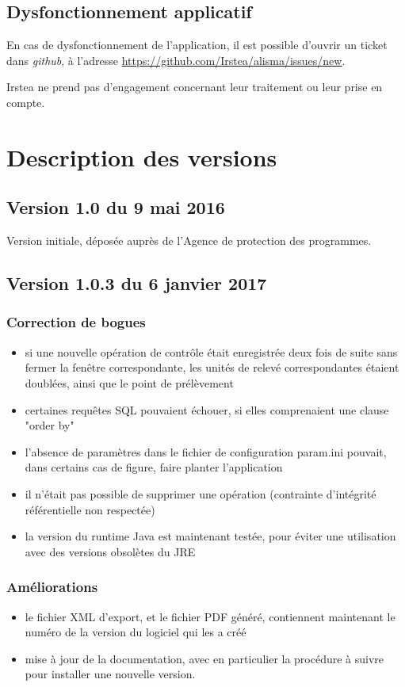 \subsection{Dysfonctionnement applicatif}

En cas de dysfonctionnement de l'application, il est possible d'ouvrir un ticket dans \textit{github}, à l'adresse \url{https://github.com/Irstea/alisma/issues/new}.

Irstea ne prend pas d'engagement concernant leur traitement ou leur prise en compte.

\section{Description des versions}
\subsection{Version 1.0 du 9 mai 2016}
Version initiale, déposée auprès de l'Agence de protection des programmes.

\subsection{Version 1.0.3 du 6 janvier 2017}
\subsubsection{Correction de bogues}
\begin{itemize}
\item si une nouvelle opération de contrôle était enregistrée deux fois de suite sans fermer la fenêtre correspondante, les unités de relevé correspondantes étaient doublées, ainsi que le point de prélèvement
\item certaines requêtes SQL pouvaient échouer, si elles comprenaient une clause "order by"
\item l'absence de paramètres dans le fichier de configuration param.ini pouvait, dans certains cas de figure, faire planter l'application
\item il n'était pas possible de supprimer une opération (contrainte d'intégrité référentielle non respectée)
\item la version du runtime Java est maintenant testée, pour éviter une utilisation avec des versions obsolètes du JRE
\end{itemize}

\subsubsection{Améliorations}
\begin{itemize}
\item le fichier XML d'export, et le fichier PDF généré, contiennent maintenant le numéro de la version du logiciel qui les a créé
\item mise à jour de la documentation, avec en particulier la procédure à suivre pour installer une nouvelle version.
\end{itemize}

